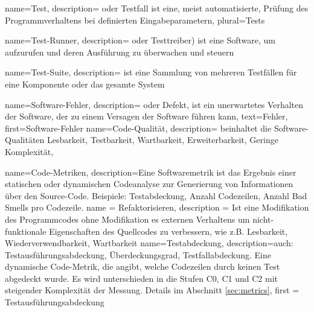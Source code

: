  {
  name={Test},
  description= {oder Testfall ist eine, meist automatisierte, Prüfung des Programmverhaltens bei definierten Eingabeparametern},
  plural=Tests
}

 {
  name={Test-Runner},
  description= {oder Testtreiber) ist eine Software, um  aufzurufen und deren Ausführung zu überwachen und steuern}
}%

 {
  name={Test-Suite},
  description= {ist eine Sammlung von mehreren Testfällen für eine Komponente oder das gesamte System}
}%

 {
  name={Software-Fehler},
  description= {oder Defekt, ist ein unerwartetes Verhalten der Software, der zu einem Versagen der Software führen kann},
text=Fehler,
first={Software-Fehler}
}
 {
  name={Code-Qualität},
  description= {beinhaltet die Software-Qualitäten Lesbarkeit, Testbarkeit, Wartbarkeit, Erweiterbarkeit, Geringe Komplexität},
}%

 {
  name={Code-Metriken},
  description={Eine Softwaremetrik ist das Ergebnis einer statischen oder dynamischen Codeanalyse zur Generierung von Informationen über den Source-Code. Beispiele: Testabdeckung, Anzahl Codezeilen, Anzahl Bad Smells pro Codezeile.}
}
 {
  name = {Refaktorisieren},
  description = {Ist eine Modifikation des Programmcodes ohne Modifikation es externen Verhaltens um nicht-funktionale Eigenschaften des Quellcodes zu verbessern, wie z.B. Lesbarkeit, Wiederverwendbarkeit, Wartbarkeit}  
}
 {
  name=Testabdeckung,
  description={auch: Testausführungsabdeckung, Überdeckungsgrad, Testfallabdeckung. Eine dynamische Code-Metrik, die angibt, welche Codezeilen durch keinen Test abgedeckt wurde. Es wird unterschieden in die Stufen C0, C1 und C2 mit steigender Komplexität der Messung. Details im Abschnitt \ref{sec:metrics}},
  first = {Testausführungsabdeckung}
}

